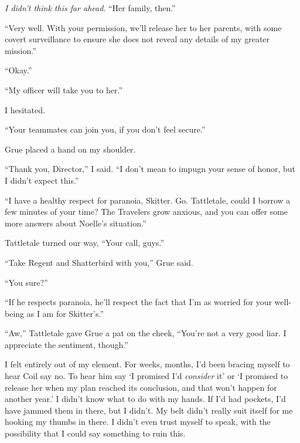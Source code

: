 \emph{I didn't think this far ahead}.  ``Her family, then.''



``Very well.  With your permission, we'll release her to her parents, with some covert surveillance to ensure she does not reveal any details of my greater mission.''



``Okay.''



``My officer will take you to her.''



I hesitated.



``Your teammates can join you, if you don't feel secure.''



Grue placed a hand on my shoulder.



``Thank you, Director,'' I said.  ``I don't mean to impugn your sense of honor, but I didn't expect this.''



``I have a healthy respect for paranoia, Skitter.  Go.  Tattletale, could I borrow a few minutes of your time?  The Travelers grow anxious, and you can offer some more answers about Noelle's situation.''



Tattletale turned our way, ``Your call, guys.''



``Take Regent and Shatterbird with you,'' Grue said.



``You sure?''



``If he respects paranoia, he'll respect the fact that I'm as worried for your well-being as I am for Skitter's.''



``Aw,'' Tattletale gave Grue a pat on the cheek, ``You're not a very good liar.  I appreciate the sentiment, though.''



I felt entirely out of my element.  For weeks, months, I'd been bracing myself to hear Coil say no.  To hear him say `I promised I'd \emph{consider} it' or `I promised to release her when my plan reached its conclusion, and that won't happen for another year.'  I didn't know what to do with my hands.  If I'd had pockets, I'd have jammed them in there, but I didn't.  My belt didn't really suit itself for me hooking my thumbs in there.  I didn't even trust myself to speak, with the possibility that I could say something to ruin this.



